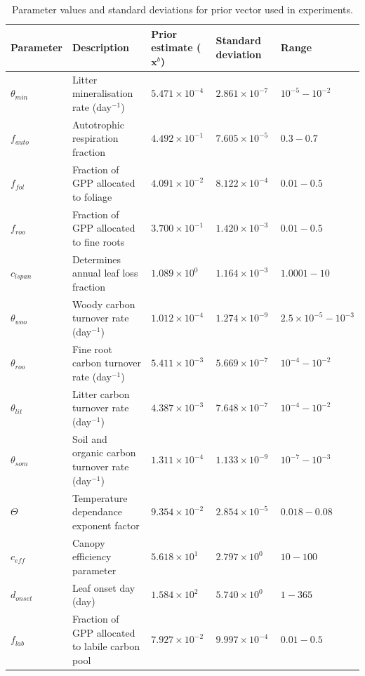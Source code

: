 \documentclass[draft,linenumbers]{agujournal}
\begin{document}
\begin{table}[ht] 
	\caption{Parameter values and standard deviations for prior vector used in experiments.}
\begin{center}
\scriptsize
	\begin{tabular}{| l | p{4.5cm} | p{1.7cm} | p{1.7cm} | p{1.7cm} |}
	\hline
	Parameter & Description & Prior estimate ($\textbf{x}^{b}$) & Standard deviation & Range \\ \hline
$\theta_{min}$ & Litter mineralisation rate (day$^{-1}$) & $5.471\times 10^{-4}$ & $2.861\times 10^{-7}$ & $10^{-5} - 10^{-2}$ \\ \hline
$f_{auto}$ & Autotrophic respiration fraction & $4.492\times 10^{-1}$ & $7.605\times 10^{-5}$ & $0.3 - 0.7$  \\ \hline
$f_{fol}$ & Fraction of GPP allocated to foliage & $4.091\times 10^{-2}$ & $8.122\times 10^{-4}$ & $0.01-0.5$ \\ \hline
$f_{roo}$ & Fraction of GPP allocated to fine roots & $3.700\times 10^{-1}$ & $1.420\times 10^{-3}$ & $0.01-0.5$ \\ \hline
$c_{lspan}$ & Determines annual leaf loss fraction & $1.089\times 10^{0} $ & $1.164\times 10^{-3}$ & $1.0001 - 10$ \\ \hline
$\theta_{woo}$ & Woody carbon turnover rate (day$^{-1}$) & $1.012\times 10^{-4}$ & $1.274\times 10^{-9}$ & $2.5\times10^{-5} - 10^{-3}$ \\ \hline
$\theta_{roo}$ & Fine root carbon turnover rate (day$^{-1}$) & $5.411\times 10^{-3}$ & $5.669\times 10^{-7}$ & $10^{-4} - 10^{-2}$ \\ \hline
$\theta_{lit}$ & Litter carbon turnover rate (day$^{-1}$) & $4.387\times 10^{-3}$ & $7.648\times 10^{-7}$ & $10^{-4} - 10^{-2}$ \\ \hline
$\theta_{som}$ & Soil and organic carbon turnover rate (day$^{-1}$) & $1.311\times 10^{-4}$ & $1.133\times 10^{-9}$ & $10^{-7} - 10^{-3}$ \\ \hline
$\Theta$ & Temperature dependance exponent factor & $9.354\times 10^{-2}$ & $2.854\times 10^{-5}$ & $0.018 - 0.08$ \\ \hline
$c_{eff}$ & Canopy efficiency parameter & $5.618\times 10^{1}$ & $2.797\times 10^{0}$ & $10 - 100$ \\ \hline
$d_{onset}$ & Leaf onset day (day) & $1.584\times 10^{2}$ & $5.740\times 10^{0}$ & $1 - 365$ \\ \hline
$f_{lab}$ & Fraction of GPP allocated to labile carbon pool & $7.927\times 10^{-2}$ & $9.997\times 10^{-4}$ & $0.01 - 0.5$ \\ \hline

\end{tabular}
\end{center}
\end{table}
\end{document}
